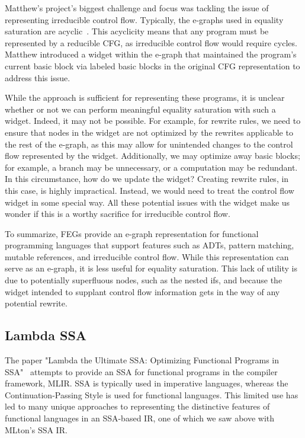 \documentclass{article}
\begin{document}
Matthew's project's biggest challenge and focus was tackling the issue of representing irreducible control flow. Typically, the e-graphs used in equality saturation are acyclic~\cite{eqsat-lmcs}. This acyclicity means that any program must be represented by a reducible CFG, as irreducible control flow would require cycles. Matthew introduced a widget within the e-graph that maintained the program's current basic block via labeled basic blocks in the original CFG representation to address this issue.

While the approach is sufficient for representing these programs, it is unclear whether or not we can perform meaningful equality saturation with such a widget. Indeed, it may not be possible. For example, for rewrite rules, we need to ensure that nodes in the widget are not optimized by the rewrites applicable to the rest of the e-graph, as this may allow for unintended changes to the control flow represented by the widget. Additionally, we may optimize away basic blocks; for example, a branch may be unnecessary, or a computation may be redundant. In this circumstance, how do we update the widget? Creating rewrite rules, in this case, is highly impractical. Instead, we would need to treat the control flow widget in some special way. All these potential issues with the widget make us wonder if this is a worthy sacrifice for irreducible control flow.

To summarize, FEGs provide an e-graph representation for functional programming languages that support features such as ADTs, pattern matching, mutable references, and irreducible control flow. While this representation can serve as an e-graph, it is less useful for equality saturation. This lack of utility is due to potentially superfluous nodes, such as the nested ifs, and because the widget intended to supplant control flow information gets in the way of any potential rewrite.


\subsection{Lambda SSA}

The paper "Lambda the Ultimate SSA: Optimizing Functional Programs in SSA"~\cite{bhat2022lambdaultimatessaoptimizing} attempts to provide an SSA for functional programs in the compiler framework, MLIR. SSA is typically used in imperative languages, whereas the Continuation-Passing Style is used for functional languages. This limited use has led to many unique approaches to representing the distinctive features of functional languages in an SSA-based IR, one of which we saw above with MLton's SSA IR.
\end{document}
